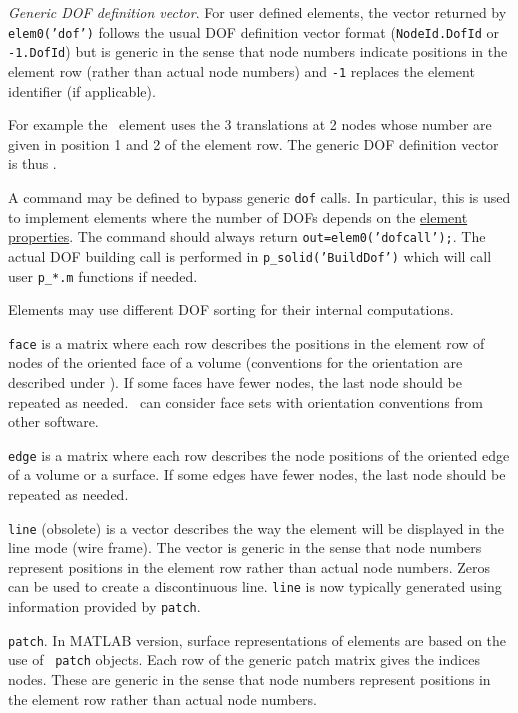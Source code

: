 
{\sl Generic DOF definition vector}. For user defined elements, the vector returned by {\tt elem0('dof')} follows the usual DOF definition vector format ({\tt NodeId.DofId} or {\tt -1.DofId}) but is generic in the sense that node numbers indicate positions in the element row (rather than actual node numbers) and {\tt -1} replaces the element identifier (if applicable).

For example the \bare\   element uses the 3 translations at 2 nodes whose number are given in position 1 and 2 of the element row. The generic DOF definition vector is thus \texline {\tt [1.01;1.02;1.03;2.01;2.01;2.03]}.

A  command may be defined to bypass generic {\tt dof} calls. In particular, this is used to implement elements where the number of DOFs depends on the \hyperlink{il}{element properties}. The command should always return {\tt out=elem0('dofcall');}. The actual DOF building call is performed in {\tt p\_solid('BuildDof')} which will call user {\tt p\_*.m} functions if needed.


Elements may use different DOF sorting for their internal computations. 


{\tt face} is a matrix where each row describes the positions in the element row of nodes of the oriented face of a volume (conventions for the orientation are described under \integrules). If some faces have fewer nodes, the last node should be repeated as needed. \feutil\ can consider face sets with orientation conventions from other software.

{\tt edge} is a matrix where each row describes the node positions of the oriented edge of a volume or a surface. If some edges have fewer nodes, the last node should be repeated as needed.

{\tt line} (obsolete) is a vector describes the way the element will be displayed in the line mode (wire frame). The vector is generic in the sense that node numbers represent positions in the element row rather than actual node numbers. Zeros can be used to create a discontinuous line. {\tt line} is now typically generated using information provided by {\tt patch}.


{\tt patch}. In MATLAB version, surface representations of elements are based on the use of \matlab\ {\tt patch} objects. Each row of the generic patch matrix gives the indices nodes. These are generic in the sense that node numbers represent positions in the element row rather than actual node numbers.

